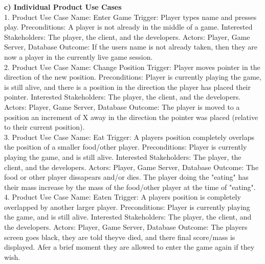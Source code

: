 \documentclass[12pt]{article}
\begin{document}
\textbf{c) Individual Product Use Cases}\newline\\
1. Product Use Case Name: Enter Game\newline
Trigger: Player types name and presses play. \newline
Preconditions: A player is not already in the middle of a game. \newline
Interested Stakeholders: The player, the client, and the developers. \newline
Actors: Player, Game Server, Database \newline
Outcome: If the users name is not already taken, then they are now a player in the currently live game session.\newline\\
2. Product Use Case Name: Change Position\newline
Trigger: Player moves pointer in the direction of the new position.\newline
Preconditions: Player is currently playing the game, is still alive, and there is a position in the direction the player has placed their pointer. \newline
Interested Stakeholders: The player, the client, and the developers. \newline
Actors: Player, Game Server, Database \newline
Outcome: The player is moved to a position an increment of X away in the direction the pointer was placed (relative to their current position).\newline\\
3. Product Use Case Name: Eat\newline
Trigger: A players position completely overlaps the position of a smaller food/other player. \newline
Preconditions: Player is currently playing the game, and is still alive. \newline
Interested Stakeholders: The player, the client, and the developers. \newline
Actors: Player, Game Server, Database \newline
Outcome: The food or other player dissapears and/or dies. The player doing the "eating" has their mass increase by the mass of the food/other player at the time of "eating".\newline\\
4. Product Use Case Name: Eaten\newline
Trigger: A players position is completely overlapped by another larger player.\newline
Preconditions: Player is currently playing the game, and is still alive. \newline
Interested Stakeholders: The player, the client, and the developers. \newline
Actors: Player, Game Server, Database \newline
Outcome: The players screen goes black, they are told theyve died, and there final score/mass is displayed. Afer a brief moment they are allowed to enter the game again if they wish. \newline
\end{document}
